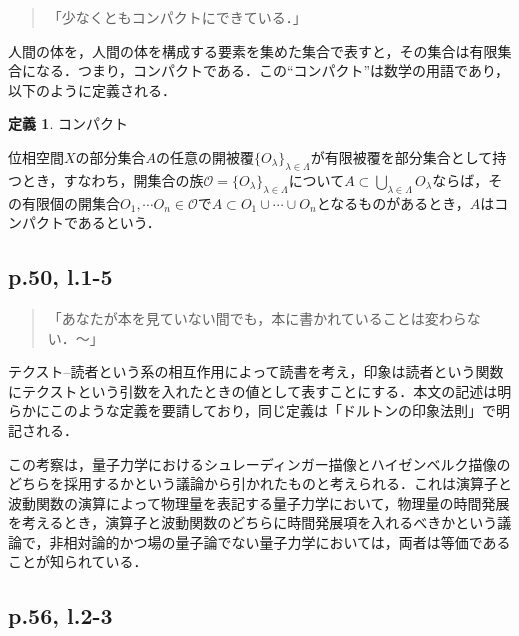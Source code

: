 \documentclass[10pt, a5paper, twoside]{jsarticle}
\theoremstyle{definition}
\newtheorem{dfn}{定義}
\begin{document}
			\begin{quote}

				「少なくともコンパクトにできている．」
				
			\end{quote}

			人間の体を，人間の体を構成する要素を集めた集合で表すと，その集合は有限集合になる．つまり，コンパクトである．この“コンパクト”は数学の用語であり，以下のように定義される\cite{hara}．

			\begin{dfn}

				コンパクト

				位相空間$X$の部分集合$A$の任意の開被覆$\{ O_\lambda \}_{\lambda \in \Lambda}$が有限被覆を部分集合として持つとき，すなわち，開集合の族$\mathcal{O} = \{ O_\lambda \}_{\lambda \in \Lambda}$について$A \subset \bigcup_{\lambda \in \Lambda} O_\lambda$ならば，その有限個の開集合$O_1, \cdots O_n \in \mathcal{O}$$でA \subset O_1 \cup \cdots \cup O_n$となるものがあるとき，$A$はコンパクトであるという．
				
			\end{dfn}

		\subsection{p.50, l.1-5}

			\begin{quote}

				「あなたが本を見ていない間でも，本に書かれていることは変わらない．〜」

			\end{quote}

			テクスト--読者という系の相互作用によって読書を考え，印象は読者という関数にテクストという引数を入れたときの値として表すことにする．本文の記述は明らかにこのような定義を要請しており，同じ定義は「ドルトンの印象法則」で明記される．

			この考察は，量子力学におけるシュレーディンガー描像とハイゼンベルク描像のどちらを採用するかという議論から引かれたものと考えられる．これは演算子と波動関数の演算によって物理量を表記する量子力学において，物理量の時間発展を考えるとき，演算子と波動関数のどちらに時間発展項を入れるべきかという議論で，非相対論的かつ場の量子論でない量子力学においては，両者は等価であることが知られている．

		\subsection{p.56, l.2-3}
\end{document}
